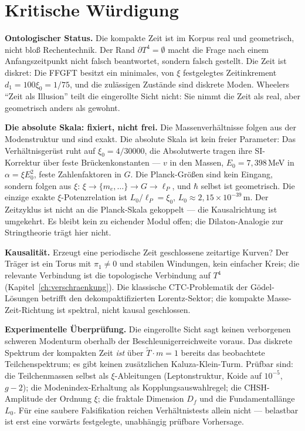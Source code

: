 \section{Kritische Würdigung}

\textbf{Ontologischer Status.} Die kompakte Zeit ist im Korpus real und
geometrisch, nicht bloß Rechentechnik. Der Rand $\partial T^4 = \emptyset$
macht die Frage nach einem Anfangszeitpunkt nicht falsch beantwortet,
sondern falsch gestellt. Die Zeit ist diskret: Die FFGFT besitzt ein
minimales, von $\xi$ festgelegtes Zeitinkrement $d_1 = 100\xi_0 = 1/75$,
und die zulässigen Zustände sind diskrete Moden. Wheelers
\enquote{Zeit als Illusion} teilt die eingerollte Sicht nicht: Sie
nimmt die Zeit als real, aber geometrisch anders als gewohnt.

\textbf{Die absolute Skala: fixiert, nicht frei.} Die Massenverhältnisse
folgen aus der Modenstruktur und sind exakt. Die absolute Skala ist
kein freier Parameter: Das Verhältnisgerüst ruht auf $\xi_0 = 4/30000$,
die Absolutwerte tragen ihre SI-Korrektur über feste Brückenkonstanten
--- $v$ in den Massen, $E_0 = 7{,}398$\,MeV in $\alpha = \xi E_0^2$,
feste Zahlenfaktoren in $G$. Die Planck-Größen sind kein Eingang,
sondern folgen aus $\xi$: $\xi\to\{m_e,\dots\}\to G\to\ell_P$, und
$\hbar$ selbst ist geometrisch. Die einzige exakte $\xi$-Potenzrelation
ist $L_0/\ell_P = \xi_0$, $L_0\approx2{,}15\times10^{-39}$\,m. Der
Zeitzyklus ist nicht an die Planck-Skala gekoppelt --- die Kausalrichtung
ist umgekehrt. Es bleibt kein zu eichender Modul offen; die
Dilaton-Analogie zur Stringtheorie trägt hier nicht.

\textbf{Kausalität.} Erzeugt eine periodische Zeit geschlossene
zeitartige Kurven? Der Träger ist ein Torus mit $\pi_1\neq0$ und stabilen
Windungen, kein einfacher Kreis; die relevante Verbindung ist die
topologische Verbindung auf $T^4$ (Kapitel~\ref{ch:verschraenkung}).
Die klassische CTC-Problematik der Gödel-Lösungen betrifft den
dekompaktifizierten Lorentz-Sektor; die kompakte Masse-Zeit-Richtung ist
spektral, nicht kausal geschlossen.

\textbf{Experimentelle Überprüfung.} Die eingerollte Sicht sagt keinen
verborgenen schweren Modenturm oberhalb der Beschleunigerreichweite
voraus. Das diskrete Spektrum der kompakten Zeit \emph{ist} über
$\tilde T\cdot m = 1$ bereits das beobachtete Teilchenspektrum; es gibt
keinen zusätzlichen Kaluza-Klein-Turm. Prüfbar sind: die Teilchenmassen
selbst als $\xi$-Ableitungen (Leptonstruktur, Koide auf $10^{-5}$,
$g-2$); die Modenindex-Erhaltung als Kopplungsauswahlregel; die
CHSH-Amplitude der Ordnung $\xi$; die fraktale Dimension $D_f$ und die
Fundamentallänge $L_0$. Für eine saubere Falsifikation reichen
Verhältnistests allein nicht --- belastbar ist erst eine vorwärts
festgelegte, unabhängig prüfbare Vorhersage.

